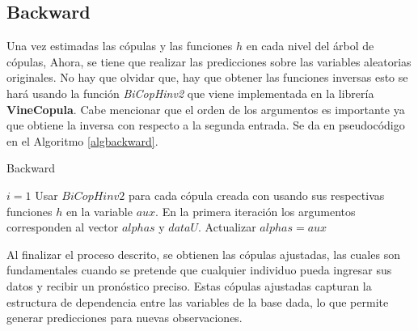 \subsection{Backward}

Una vez estimadas las cópulas y las funciones $h$  en cada nivel del árbol de cópulas, Ahora, se tiene que realizar las predicciones sobre las variables aleatorias originales. No hay que olvidar que, hay que obtener las funciones inversas esto se hará usando la función \textit{BiCopHinv2} que viene implementada en la librería \textbf{VineCopula}. Cabe mencionar que el orden de los argumentos es importante ya que obtiene la inversa con respecto a la segunda entrada. Se da en pseudocódigo en el Algoritmo \ref{algbackward}.


\begin{algorithm}[H]
      \caption{Backward}
      \label{algbackward}
      \begin{algorithmic}[1]  
        
        \State $i = 1$
          \State Usar $BiCopHinv2$ para cada cópula creada con usando sus respectivas funciones $h$ en la variable $aux$. En la primera iteración los argumentos corresponden al vector $alphas$ y $dataU$.
          \State Actualizar $alphas = aux$
        \EndWhile
       
      \end{algorithmic}
    \end{algorithm}

Al finalizar el proceso descrito, se obtienen las cópulas ajustadas, las cuales son fundamentales cuando se pretende que cualquier individuo pueda ingresar sus datos y recibir un pronóstico preciso. Estas cópulas ajustadas capturan la estructura de dependencia entre las variables de la base dada, lo que permite generar predicciones para nuevas observaciones. 